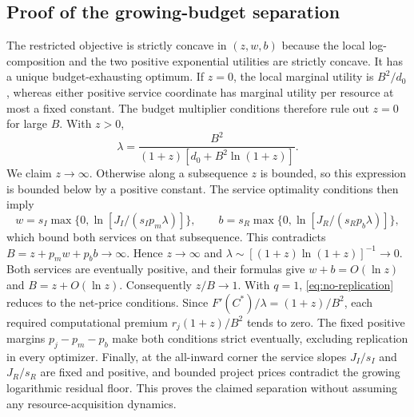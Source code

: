 \subsection{Proof of the growing-budget separation}
\label{app:growing-norep-proof}
The restricted objective is strictly concave in $(z,w,b)$ because the
local log-composition and the two positive exponential utilities are
strictly concave. It has a unique budget-exhausting optimum. If $z=0$,
the local marginal utility is $B^2/d_0$, whereas either positive service
coordinate has marginal utility per resource at most a fixed constant.
The budget multiplier conditions therefore rule out $z=0$ for large $B$.
With $z>0$,
\[
 \lambda=\frac{B^2}{(1+z)[d_0+B^2\ln(1+z)]}.
\]
We claim $z\to\infty$. Otherwise along a subsequence $z$ is bounded,
so this expression is bounded below by a positive constant. The service
optimality conditions then imply
\[
 w=s_I\max\{0,\ln[J_I/(s_Ip_m\lambda)]\},\qquad
 b=s_R\max\{0,\ln[J_R/(s_Rp_b\lambda)]\},
\]
which bound both services on that subsequence. This contradicts
$B=z+p_mw+p_bb\to\infty$. Hence $z\to\infty$ and
$\lambda\sim[(1+z)\ln(1+z)]^{-1}\to0$. Both services are eventually
positive, and their formulas give $w+b=O(\ln z)$ and
$B=z+O(\ln z)$. Consequently $z/B\to1$.
With $q=1$, \cref{eq:no-replication} reduces to the net-price conditions.
Since $F'(C^*)/\lambda=(1+z)/B^2$, each required computational premium
$r_j(1+z)/B^2$ tends to zero. The fixed positive margins
$p_j-p_m-p_b$ make both conditions strict eventually, excluding replication
in every optimizer. Finally, at the all-inward corner the service slopes
$J_I/s_I$ and $J_R/s_R$ are fixed and positive, and bounded project prices
contradict the growing logarithmic residual floor. This proves the
claimed separation without assuming any resource-acquisition dynamics.


